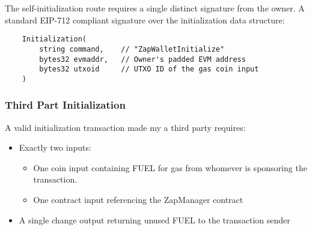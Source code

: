 The self-initialization route requires a single distinct signature from the owner. A standard EIP-712 compliant signature over the initialization data structure:

\begin{lstlisting}
    Initialization(
        string command,    // "ZapWalletInitialize"
        bytes32 evmaddr,   // Owner's padded EVM address
        bytes32 utxoid     // UTXO ID of the gas coin input
    )
\end{lstlisting}


\subsubsection{Third Part Initialization}
A valid initialization transaction made my a third party requires:
\begin{itemize}
    \item Exactly two inputs:
        \begin{itemize}
            \item One coin input containing FUEL  for gas from whomever is sponsoring the transaction.
            \item One contract input referencing the ZapManager contract
        \end{itemize}
    \item A single change output returning unused FUEL  to the transaction sender
\end{itemize}







